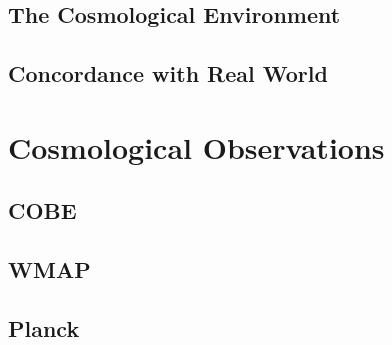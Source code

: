 	
	\subsection{The Cosmological Environment}
	\label{subsec:TheCosmologicalEnvironment}
	
	
	\subsection{Concordance with Real World}
	\label{subsec:ConcordanceWithRealWorld}
	
	

\section{Cosmological Observations}
\label{sec:CosmologicalObservations}


	\subsection{COBE}
	\label{subsec:COBE}
	
	
	\subsection{WMAP}
	\label{subsec:WMAP}
	
	
	\subsection{Planck}
	\label{subsec:Planck}

